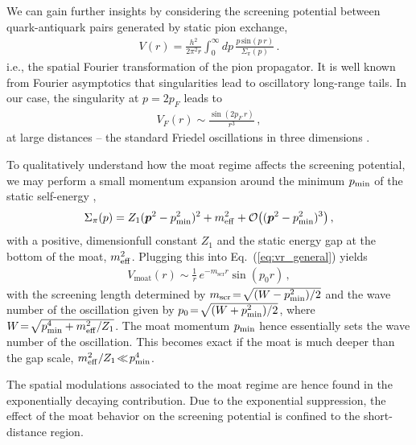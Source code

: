 \documentclass[reprint,english,superscriptaddress,preprintnumbers,amsmath,amssymb,aps,prd]{revtex4-2}
\def\Eq#1{Eq.~(\ref{#1})}
\begin{document}
We can gain further insights by considering the screening potential between quark-antiquark pairs generated by static pion exchange,
%
\begin{align}\label{eq:vr_general}
    V(r)=\frac{h^2}{2\pi^2r}\int_0^\infty\! dp\,\frac{p\,\mathrm{sin}(p\,r)}{\Sigma_\pi(p)}\,.
\end{align}
%
i.e., the spatial Fourier transformation of the pion propagator. It is well known from Fourier asymptotics that singularities lead to oscillatory long-range tails. In our case, the singularity at $p = 2p_F$ leads to
%
\begin{align}\label{eq:VF}
V_{F}(r)\sim \frac{\sin(2p_F\,r)}{r^3}\,,
\end{align}
%
at large distances -- the standard Friedel oscillations in three dimensions \cite{fetter2012quantum, Kapusta:1988fi,DiazAlonso:1989up, Diaz-Alonso:1998eva, Liu:2007bu}. 

To qualitatively understand how the moat regime affects the screening potential, we may perform a small momentum expansion around the minimum $p_{\rm min}$ of the static self-energy \cite{Fu:2024rto},
%
\begin{align}\label{eq:expansion}
\Sigma_{\pi}(p)= Z_1(\boldsymbol{p}^2-p^2_{\rm min})^2+m^2_{\rm eff} + \mathcal{O}\big((\boldsymbol{p}^2-p^2_{\rm min})^3\big)\,,
\end{align}
%
with a positive, dimensionfull constant $Z_1$ and the static energy gap at the bottom of the moat, $m^2_{\rm eff}$. Plugging this into \Eq{eq:vr_general} yields
%
\begin{align}\label{eq:Vmoat}
V_{\mathrm{moat}}(r)\sim\frac{1}{r}\,e^{-m_\mathrm{scr}r}\sin(p_0 r)\,,
\end{align}
%
with the screening length determined by $m_{\rm scr} \!=\! \sqrt{(W-p_{\rm min}^2)/2}$ and the wave number of the oscillation given by $p_0 \!=\! \sqrt{(W+p_{\rm min}^2)/2}$, where $W \!=\! \sqrt{p_{\rm min}^4+m_{\rm eff}^2/Z_1}$. The moat momentum $p_{\rm min}$ hence essentially sets the wave number of the oscillation. This becomes exact if the moat is much deeper than the gap scale, $m_{\rm eff}^2/Z_1 \!\ll\! p_{\rm min}^4$.

The spatial modulations associated to the moat regime are hence found in the exponentially decaying contribution.
Due to the exponential suppression, the effect of the moat behavior on the screening potential is confined to the short-distance region.
\end{document}
